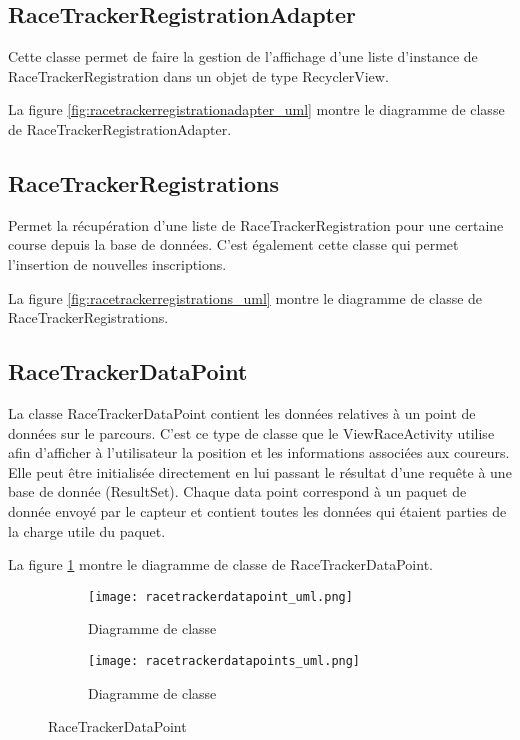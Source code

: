 \subsection{RaceTrackerRegistrationAdapter}

Cette classe permet de faire la gestion de l'affichage d'une liste d'instance de RaceTrackerRegistration dans un objet de type RecyclerView.

La figure \ref{fig:racetrackerregistrationadapter_uml} montre le diagramme de classe de RaceTrackerRegistrationAdapter.

\subsection{RaceTrackerRegistrations}

Permet la récupération d'une liste de RaceTrackerRegistration pour une certaine course depuis la base de données. C'est également cette classe qui permet l'insertion de nouvelles inscriptions.

La figure \ref{fig:racetrackerregistrations_uml} montre le diagramme de classe de RaceTrackerRegistrations.

\subsection{RaceTrackerDataPoint}

La classe RaceTrackerDataPoint contient les données relatives à un point de données sur le parcours. C'est ce type de classe que le ViewRaceActivity utilise afin d'afficher à l'utilisateur la position et les informations associées aux coureurs. Elle peut être initialisée directement en lui passant le résultat d'une requête à une base de donnée (ResultSet). Chaque data point correspond à un paquet de donnée envoyé par le capteur et contient toutes les données qui étaient parties de la charge utile du paquet.

La figure \ref{fig:racetrackerdatapoint_uml} montre le diagramme de classe de RaceTrackerDataPoint.
 
 \begin{figure}[htb!]
    \centering
    \begin{subfigure}[htb]{1\textwidth}
		\texttt{[image: racetrackerdatapoint\_uml.png]} 
		\caption{Diagramme de classe}
		\label{fig:racetrackerdatapoint_uml}
    \end{subfigure}
    \begin{subfigure}[htb]{1\textwidth}
		\texttt{[image: racetrackerdatapoints\_uml.png]} 
		\caption{Diagramme de classe}
		\label{fig:racetrackerdatapoints_uml}
    \end{subfigure}
    \caption{RaceTrackerDataPoint}\label{fig:racetrackerdatapoints_fig}
\end{figure}

